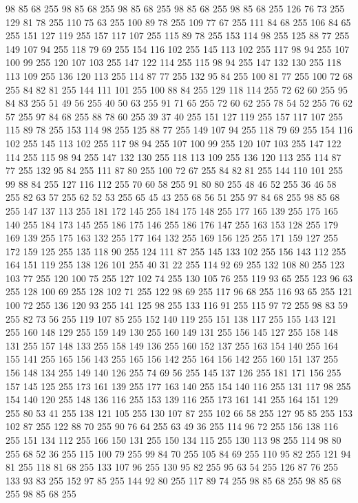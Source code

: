 98 85 68 255 98 85 68 255 98 85 68 255 98 85 68 255 98 85 68 255 126 76 73 255 129 81 78 255 110 75 63 255 100 89 78 255 109 77 67 255 111 84 68 255 106 84 65 255 151 127 119 255 157 117 107 255 115 89 78 255 153 114 98 255 125 88 77 255 149 107 94 255 118 79 69 255 154 116 102 255 145 113 102 255 117 98 94 255 107 100 99 255 120 107 103 255 147 122 114 255 115 98 94 255 147 132 130 255 118 113 109 255 136 120 113 255 114 87 77 255 132 95 84 255 100 81 77 255 100 72 68 255 84 82 81 255 144 111 101 255 100 88 84 255 129 118 114 255 72 62 60 255 95 84 83 255 51 49 56 255 40 50 63 255 91 71 65 255 72 60 62 255 78 54 52 255 76 62 57 255 97 84 68 255 88 78 60 255 39 37 40 255 151 127 119 255 157 117 107 255 115 89 78 255 153 114 98 255 125 88 77 255 149 107 94 255 118 79 69 255 154 116 102 255 145 113 102 255 117 98 94 255 107 100 99 255 120 107 103 255 147 122 114 255 115 98 94 255 147 132 130 255 118 113 109 255
136 120 113 255 114 87 77 255 132 95 84 255 111 87 80 255 100 72 67 255 84 82 81 255 144 110 101 255 99 88 84 255 127 116 112 255 70 60 58 255 91 80 80 255 48 46 52 255 36 46 58 255 82 63 57 255 62 52 53 255 65 45 43 255 68 56 51 255 97 84 68 255 98 85 68 255 147 137 113 255 181 172 145 255 184 175 148 255 177 165 139 255 175 165 140 255 184 173 145 255 186 175 146 255 186 176 147 255 163 153 128 255 179 169 139 255 175 163 132 255 177 164 132 255 169 156 125 255 171 159 127 255 172 159 125 255 135 118 90 255 124 111 87 255 145 133 102 255 156 143 112 255 164 151 119 255 138 126 101 255 40 31 22 255 114 92 69 255 132 108 80 255 123 103 77 255 120 100 75 255 127 102 74 255 130 105 76 255 119 93 65 255 123 96 63 255 128 100 69 255 128 102 71 255 122 98 69 255 117 96 68 255 116 93 65 255 121 100 72 255 136 120 93 255 141 125 98 255 133 116 91 255 115 97 72 255 98 83 59 255 82 73 56 255 119 107 85 255 152 140 119 255 151 138 117 255
155 143 121 255 160 148 129 255 159 149 130 255 160 149 131 255 156 145 127 255 158 148 131 255 157 148 133 255 158 149 136 255 160 152 137 255 163 154 140 255 164 155 141 255 165 156 143 255 165 156 142 255 164 156 142 255 160 151 137 255 156 148 134 255 149 140 126 255 74 69 56 255 145 137 126 255 181 171 156 255 157 145 125 255 173 161 139 255 177 163 140 255 154 140 116 255 131 117 98 255 154 140 120 255 148 136 116 255 153 139 116 255 173 161 141 255 164 151 129 255 80 53 41 255 138 121 105 255 130 107 87 255 102 66 58 255 127 95 85 255 153 102 87 255 122 88 70 255 90 76 64 255 63 49 36 255 114 96 72 255 156 138 116 255 151 134 112 255 166 150 131 255 150 134 115 255 130 113 98 255 114 98 80 255 68 52 36 255 115 100 79 255 99 84 70 255 105 84 69 255 110 95 82 255 121 94 81 255 118 81 68 255 133 107 96 255 130 95 82 255 95 63 54 255 126 87 76 255 133 93 83 255 152 97 85 255 144 92 80 255 117 89 74 255 98 85 68 255 98 85 68 255 98 85 68 255
